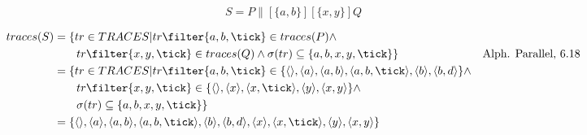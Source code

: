 \documentclass{scrreprt}
\begin{document}
\newpage

\begin{equation*}
  S = P \parallel[\{a, b\}][\{x, y\}] Q
\end{equation*}

\begin{align*}
  traces(S) &= \{ tr \in TRACES | tr \filter \{ a, b, \tick \} \in traces(P) \wedge \\
            &\hspace{0.7cm} tr \filter \{ x, y, \tick \} \in traces(Q) \wedge \sigma(tr) \subseteq \{ a, b, x, y, \tick \} \} & \text{Alph. Parallel, 6.18} \\
            &= \{ tr \in TRACES | tr \filter \{ a, b, \tick \} \in  \{ \langle \rangle, \langle a \rangle, \langle a, b \rangle, \langle a, b, \tick \rangle, \langle b \rangle, \langle b, d \rangle \} \wedge \\
            &\hspace{0.7cm} tr \filter \{ x, y, \tick \} \in \{ \langle \rangle, \langle x \rangle, \langle x, \tick \rangle, \langle y \rangle, \langle x, y \rangle \} \wedge \\
            &\hspace{0.7cm} \sigma(tr) \subseteq \{ a, b, x, y, \tick \} \} \\
            &= \{ \langle \rangle, \langle a \rangle, \langle a, b \rangle, \langle a, b, \tick \rangle, \langle b \rangle, \langle b, d \rangle, \langle x \rangle, \langle x, \tick \rangle, \langle y \rangle, \langle x, y \rangle \} 
\end{align*}
\end{document}
